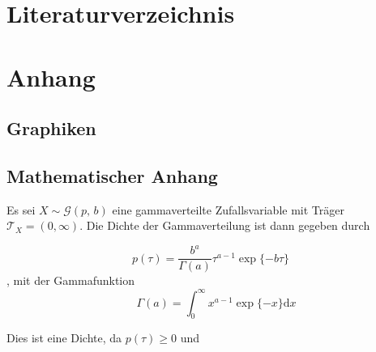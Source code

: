 \documentclass[12pt, a4paper, oneside]{article}
\newcounter{SeitenzahlSpeicher}
\begin{document}
\newpage
\clearpage
{}
\setcounter{page}{\theSeitenzahlSpeicher}




\section{Literaturverzeichnis}

\renewcommand{\refname}{} 


\newpage


\appendix %
\section{Anhang}
\subsection{Graphiken}
%

%
\newpage

%
\subsection{Mathematischer Anhang}

Es sei $X\sim \mathcal{G}(p,\, b)$ eine gammaverteilte Zufallsvariable mit Träger $\mathcal T_X =(0, \infty)$. Die Dichte der Gammaverteilung ist dann gegeben durch
%

\begin{equation*} p(\tau) = \frac{b^a}{\Gamma(a)}\tau^{a-1}\operatorname{exp}\{-b\tau\}
\end{equation*}, mit der Gammafunktion
\begin{equation*} \quad\Gamma(a)= \int_{0}^{\infty}x^{a-1}\operatorname{exp}\{-x\}\mathrm dx
\end{equation*}

Dies ist eine Dichte, da $p(\tau) \geq 0$ und
\end{document}
